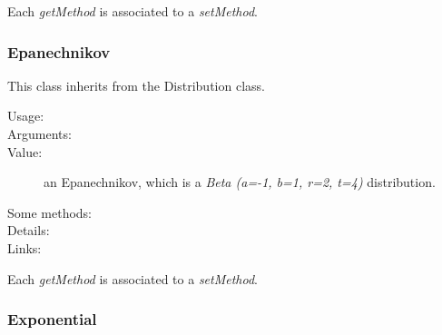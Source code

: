 Each  \textit{getMethod}  is associated to a \textit{setMethod}.



\newpage
\subsubsection{Epanechnikov}


This class inherits from the Distribution class.

\begin{description}

\item[Usage:]

\item[Arguments:]  \rule{0pt}{1em}

\item[Value:] an Epanechnikov, which is a \textit{Beta (a=-1, b=1, r=2, t=4)} distribution.

\item[Some methods:]  \rule{0pt}{1em}



\item[Details:]  \rule{0pt}{1em}

\item[Links:]  \rule{0pt}{1em}
\end{description}

Each  \textit{getMethod}  is associated to a \textit{setMethod}.


\newpage
\subsubsection{Exponential}



